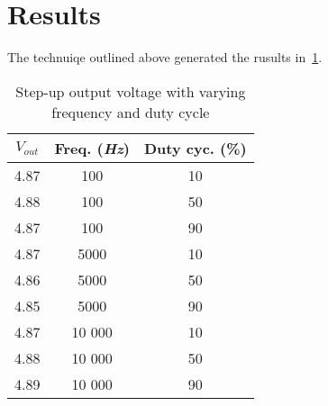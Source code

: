 \section{Results}
The technuiqe outlined above generated the rusults in~\ref{tab:meas}.
\begin{table}[h]
    \begin{center}
        \caption{Step-up output voltage with varying frequency and duty cycle}
        \label{tab:meas}
        \begin{tabular}{c|c|c}
            $V_{out}$ & Freq. (\textit{Hz}) & Duty cyc. (\%)\\
            \hline
            4.87 & 100 & 10\\
            4.88 & 100 & 50\\
            4.87 & 100 & 90\\
            4.87 & 5000 & 10\\
            4.86 & 5000 & 50\\
            4.85 & 5000 & 90\\
            4.87 & 10 000 & 10\\
            4.88 & 10 000 & 50\\
            4.89 & 10 000 & 90\\
        \end{tabular}
    \end{center}
\end{table}
